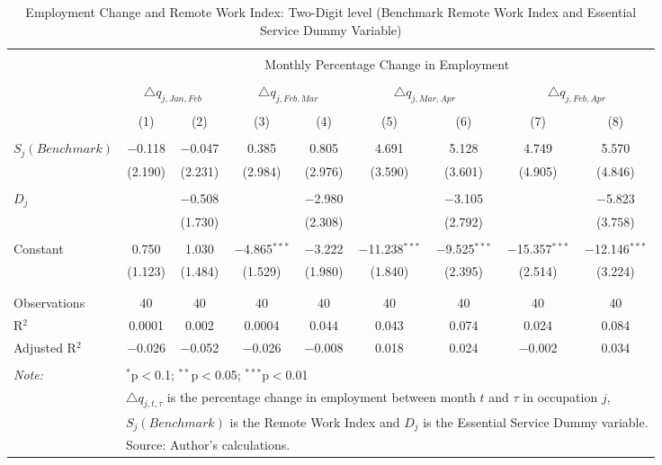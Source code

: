 
\begin{table}[!htbp] \centering 
  \caption{Employment Change and Remote Work Index: Two-Digit level (Benchmark Remote Work Index and Essential Service Dummy Variable)} 
  \label{tab:regression_dynamics_2digit} 
\footnotesize 
\begin{tabular}{@{\extracolsep{5pt}}lcccccccc} 
\\[-1.8ex]\hline 
\hline \\[-1.8ex] 
 & \multicolumn{8}{c}{Monthly Percentage Change in Employment} \\ 
\cline{2-9} 
\\[-1.8ex] & \multicolumn{2}{c}{$\triangle q_{j,Jan,Feb}$} & \multicolumn{2}{c}{$\triangle q_{j,Feb,Mar}$} & \multicolumn{2}{c}{$\triangle q_{j,Mar,Apr}$} & \multicolumn{2}{c}{$\triangle q_{j,Feb,Apr}$} \\ 
\\[-1.8ex] & (1) & (2) & (3) & (4) & (5) & (6) & (7) & (8)\\ 
\hline \\[-1.8ex] 
 $S_{j} (Benchmark)$ & $-$0.118 & $-$0.047 & 0.385 & 0.805 & 4.691 & 5.128 & 4.749 & 5.570 \\ 
  & (2.190) & (2.231) & (2.984) & (2.976) & (3.590) & (3.601) & (4.905) & (4.846) \\ 
  & & & & & & & & \\ 
 $D_{j}$ &  & $-$0.508 &  & $-$2.980 &  & $-$3.105 &  & $-$5.823 \\ 
  &  & (1.730) &  & (2.308) &  & (2.792) &  & (3.758) \\ 
  & & & & & & & & \\ 
 Constant & 0.750 & 1.030 & $-$4.865$^{***}$ & $-$3.222 & $-$11.238$^{***}$ & $-$9.525$^{***}$ & $-$15.357$^{***}$ & $-$12.146$^{***}$ \\ 
  & (1.123) & (1.484) & (1.529) & (1.980) & (1.840) & (2.395) & (2.514) & (3.224) \\ 
  & & & & & & & & \\ 
\hline \\[-1.8ex] 
Observations & 40 & 40 & 40 & 40 & 40 & 40 & 40 & 40 \\ 
R$^{2}$ & 0.0001 & 0.002 & 0.0004 & 0.044 & 0.043 & 0.074 & 0.024 & 0.084 \\ 
Adjusted R$^{2}$ & $-$0.026 & $-$0.052 & $-$0.026 & $-$0.008 & 0.018 & 0.024 & $-$0.002 & 0.034 \\ 
\hline 
\hline \\[-1.8ex] 
\textit{Note:}  & \multicolumn{8}{l}{$^{*}$p$<$0.1; $^{**}$p$<$0.05; $^{***}$p$<$0.01} \\ 
 & \multicolumn{8}{l}{$\triangle q_{j,t,\tau}$ is the percentage change in employment between month $t$ and $\tau$ in occupation $j$,} \\ 
 & \multicolumn{8}{l}{$S_{j} (Benchmark)$ is the Remote Work Index and $D_{j}$ is the Essential Service Dummy variable.} \\ 
 & \multicolumn{8}{l}{Source: Author's calculations.} \\ 
\end{tabular} 
\end{table} 
